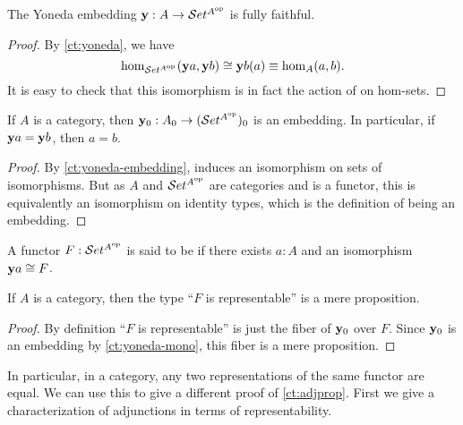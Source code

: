 \begin{cor}\label{ct:yoneda-embedding}
  The Yoneda embedding $\mathbf{y} :A\to \mathcal{S}et^{A^{\textrm{op}}}$ is fully faithful.
\end{cor}
\begin{proof}
  By \autoref{ct:yoneda}, we have
  \[ \hom_{\mathcal{S}et^{A^{\textrm{op}}}}(\mathbf{y} a, \mathbf{y} b) \cong \mathbf{y} b(a) \equiv \hom_A(a,b). \]
  It is easy to check that this isomorphism is in fact the action of \y on hom-sets.
\end{proof}

\begin{cor}\label{ct:yoneda-mono}
  If $A$ is a category, then $\mathbf{y}_0 : A_0 \to (\mathcal{S}et^{A^{\textrm{op}}})_0$ is an embedding.
  In particular, if $\mathbf{y} a = \mathbf{y} b$, then $a=b$.
\end{cor}
\begin{proof}
  By \autoref{ct:yoneda-embedding}, \y induces an isomorphism on sets of isomorphisms.
  But as $A$ and $\mathcal{S}et^{A^{\textrm{op}}}$ are categories and \y is a functor, this is equivalently an isomorphism on identity types, which is the definition of being an embedding.
\end{proof}

\begin{defn}\label{ct:representable}
  A functor $F:\mathcal{S}et^{A^{\textrm{op}}}$ is said to be  if there exists $a:A$ and an isomorphism $\mathbf{y} a \cong F$.
\end{defn}

\begin{thm}\label{ct:representable-prop}
  If $A$ is a category, then the type ``$F$ is representable'' is a mere proposition.
\end{thm}
\begin{proof}
  By definition ``$F$ is representable'' is just the fiber of $\mathbf{y}_0$ over $F$.
  Since $\mathbf{y}_0$ is an embedding by \autoref{ct:yoneda-mono}, this fiber is a mere proposition.
\end{proof}

In particular, in a category, any two representations of the same functor are equal.
We can use this to give a different proof of \autoref{ct:adjprop}.
First we give a characterization of adjunctions in terms of representability.

